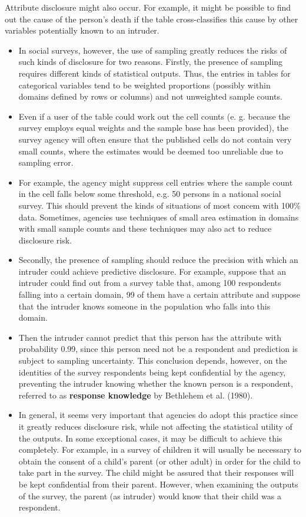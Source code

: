 Attribute disclosure might also occur. For example, it might be possible to find out the
cause of the person’s death if the table cross-classifies this cause by other variables
potentially known to an intruder.
\begin{itemize}
\item In social surveys, however, the use of sampling greatly reduces the risks of such kinds
of disclosure for two reasons. Firstly, the presence of sampling requires different kinds of
statistical outputs. Thus, the entries in tables for categorical variables tend to be weighted
proportions (possibly within domains defined by rows or columns) and not unweighted
sample counts. 
\item Even if a user of the table could work out the cell counts (e. g. because the
survey employs equal weights and the sample base has been provided), the survey agency
will often ensure that the published cells do not contain very small counts, where the
estimates would be deemed too unreliable due to sampling error. 
\item For example, the agency
might suppress cell entries where the sample count in the cell falls below some threshold,
e.g. 50 persons in a national social survey. This should prevent the kinds of situations of
most concem with 100\% data. Sometimes, agencies use techniques of small area
estimation in domains with small sample counts and these techniques may also act to
reduce disclosure risk.
\item Secondly, the presence of sampling should reduce the precision with which an
intruder could achieve predictive disclosure. For example, suppose that an intruder could
find out from a survey table that, among 100 respondents falling into a certain domain, 99
of them have a certain attribute and suppose that the intruder knows someone in the
population who falls into this domain. 
\item Then the intruder cannot predict that this person
has the attribute with probability 0.99, since this person need not be a respondent and
prediction is subject to sampling uncertainty. This conclusion depends, however, on the
identities of the survey respondents being kept confidential by the agency, preventing the
intruder knowing whether the known person is a respondent, referred to as \textbf{response
knowledge} by Bethlehem et al. (1980). 

\item In general, it seems very important that agencies
do adopt this practice since it greatly reduces disclosure risk, while not affecting the
statistical utility of the outputs. In some exceptional cases, it may be difficult to achieve
this completely. For example, in a survey of children it will usually be necessary to
obtain the consent of a child’s parent (or other adult) in order for the child to take part in
the survey. The child might be assured that their responses will be kept conﬁdential from
their parent. However, when examining the outputs of the survey, the parent (as intruder)
would know that their child was a respondent.
\end{itemize}

